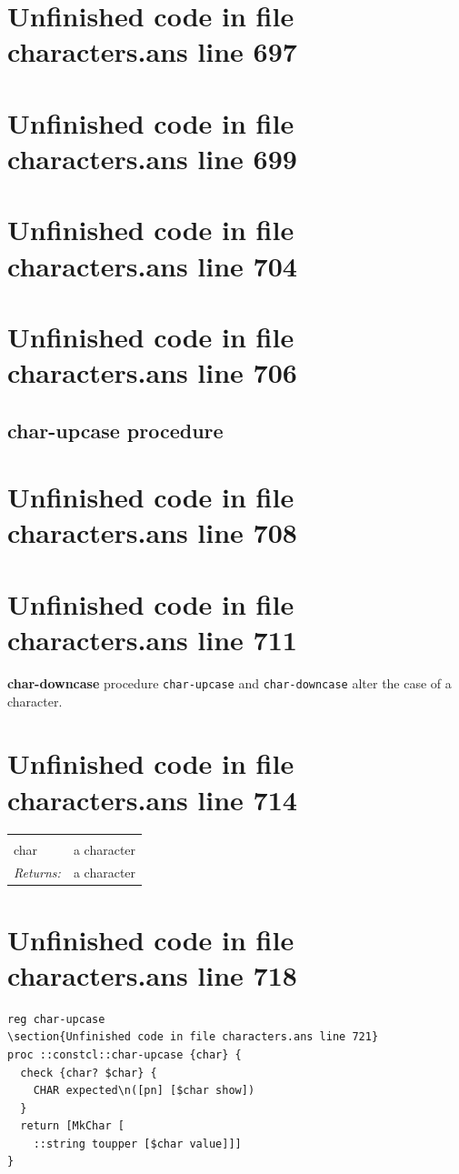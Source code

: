 \documentclass[twoside,9pt]{report}
\begin{document}
\section{Unfinished code in file characters.ans line 697}
\section{Unfinished code in file characters.ans line 699}
\section{Unfinished code in file characters.ans line 704}
\section{Unfinished code in file characters.ans line 706}
\subsection{char-upcase procedure}
\label{char-upcase-procedure}
\section{Unfinished code in file characters.ans line 708}

\section{Unfinished code in file characters.ans line 711}

\textbf{char-downcase} procedure \texttt{char-upcase} and \texttt{char-downcase} alter the case of a character.

\section{Unfinished code in file characters.ans line 714}
\noindent\begin{tabular}{ |p{1.9cm} p{8cm}| }
\hline
\rowcolor[HTML]{CCCCCC} \multicolumn{2}{|l|}{\bf char-upcase, char-downcase (public)} \\
char & a character \\
\textit{Returns:} & a character \\
\hline
\end{tabular}
\section{Unfinished code in file characters.ans line 718}
\begin{lstlisting}
reg char-upcase
\section{Unfinished code in file characters.ans line 721}
proc ::constcl::char-upcase {char} {
  check {char? $char} {
    CHAR expected\n([pn] [$char show])
  }
  return [MkChar [
    ::string toupper [$char value]]]
}
\end{lstlisting}
\end{document}
